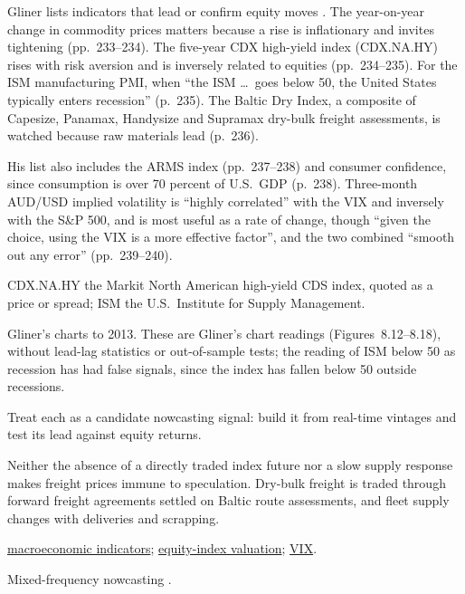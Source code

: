 \begin{qfmethod}\label{meth:equity-macro-leading-indicators}
 Gliner lists indicators that lead or confirm equity moves \citep[chap.~8, sec.\ ``Valuation Techniques for Equities'', PDF pp.~233--240]{s7-gliner}. The year-on-year change in commodity prices matters because a rise is inflationary and invites tightening (pp.~233--234). The five-year CDX high-yield index (CDX.NA.HY) rises with risk aversion and is inversely related to equities (pp.~234--235). For the ISM manufacturing PMI, when ``the ISM \dots\ goes below 50, the United States typically enters recession'' (p.~235). The Baltic Dry Index, a composite of Capesize, Panamax, Handysize and Supramax dry-bulk freight assessments, is watched because raw materials lead (p.~236).

His list also includes the ARMS index (pp.~237--238) and consumer confidence, since consumption is over 70 percent of U.S.\ GDP (p.~238). Three-month AUD/USD implied volatility is ``highly correlated'' with the VIX and inversely with the S\&P 500, and is most useful as a rate of change, though ``given the choice, using the VIX is a more effective factor'', and the two combined ``smooth out any error'' (pp.~239--240).

 CDX.NA.HY the Markit North American high-yield CDS index, quoted as a price or spread; ISM the U.S.\ Institute for Supply Management.

 Gliner's charts to 2013. These are Gliner's chart readings (Figures~8.12--8.18), without lead-lag statistics or out-of-sample tests; the reading of ISM below 50 as recession has had false signals, since the index has fallen below 50 outside recessions.

 Treat each as a candidate nowcasting signal: build it from real-time vintages and test its lead against equity returns.

 Neither the absence of a directly traded index future nor a slow supply response makes freight prices immune to speculation. Dry-bulk freight is traded through forward freight agreements settled on Baltic route assessments, and fleet supply changes with deliveries and scrapping.

 \hyperref[def:macroeconomic-indicators]{macroeconomic indicators}; \hyperref[meth:equity-index-valuation]{equity-index valuation}; \hyperref[def:vix-variance-dividend-swaps]{VIX}.

 Mixed-frequency nowcasting \citep{wide-banbura-nowcasting}.

\end{qfmethod}
